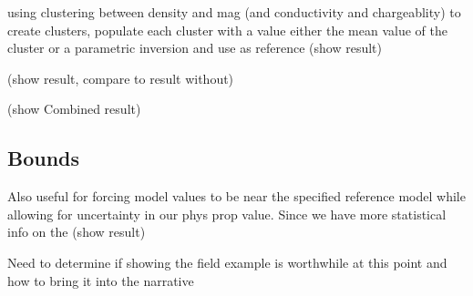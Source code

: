 using clustering between density and mag (and conductivity and chargeablity) to create clusters, populate each cluster with a value either the mean value of the cluster or a parametric inversion and use as reference
(show result)

(show result, compare to result without)

(show Combined result)
\subsection{Bounds}
\label{sec:Bounds:TKC}

Also useful for forcing model values to be near the specified reference model while allowing for uncertainty in our phys prop value. Since we have more statistical info on the 
(show result)

Need to determine if showing the field example is worthwhile at this point and how to bring it into the narrative

\endinput

Any text after an \endinput is ignored.
You could put scraps here or things in progress.
